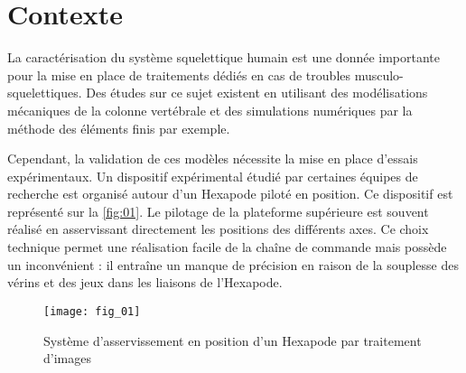 
\section*{Contexte}

La caractérisation du système squelettique humain est une donnée importante pour la mise en place de traitements
dédiés en cas de troubles musculo-squelettiques. Des études sur ce sujet existent en utilisant des modélisations
mécaniques de la colonne vertébrale et des simulations numériques par la méthode des éléments finis
par exemple.

Cependant, la validation de ces modèles nécessite la mise en place d’essais expérimentaux. Un dispositif expérimental
étudié par certaines équipes de recherche est organisé autour d’un Hexapode piloté en position. Ce
dispositif est représenté sur la \autoref{fig:01}. Le pilotage de la plateforme supérieure est souvent réalisé en asservissant
directement les positions des différents axes. Ce choix technique permet une réalisation facile de la chaîne de
commande mais possède un inconvénient : il entraîne un manque de précision en raison de la souplesse des vérins
et des jeux dans les liaisons de l’Hexapode.

\begin{figure}[H]
\centering
\texttt{[image: fig\_01]}
\caption{\label{fig:01} Système d’asservissement en position d’un Hexapode par traitement d’images}
\end{figure}



